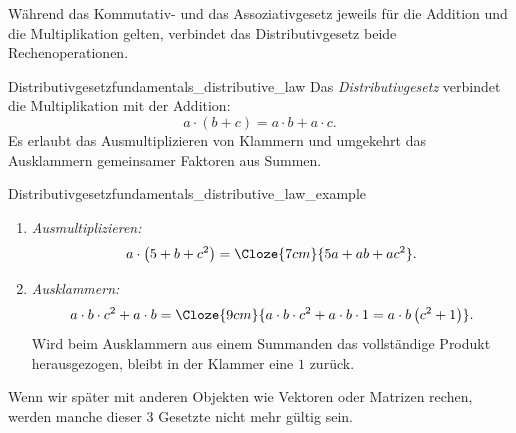 \noindent\begin{minipage}{\linewidth}
Während das Kommutativ- und das Assoziativgesetz jeweils für die Addition und
die Multiplikation gelten, verbindet das Distributivgesetz beide Rechenoperationen.
%
\begin{DefinitionBox}{Distributivgesetz}{fundamentals_distributive_law}
  Das \emph{Distributivgesetz}  verbindet die
  Multiplikation mit der Addition:
  \[
    a\cdot(b+c)=a\cdot b+a\cdot c.
  \]
  Es erlaubt das Ausmultiplizieren von Klammern und umgekehrt das Ausklammern
  gemeinsamer Faktoren aus Summen.
\end{DefinitionBox}

\begin{ExampleBox}{Distributivgesetz}{fundamentals_distributive_law_example}
  \begin{enumerate}[label=\alph*),itemsep=0.8em]
    \item \emph{Ausmultiplizieren:}
      \[
        a\cdot\left(5+b+c^2\right)
        =\Cloze{7cm}{5a+ab+ac^2}.
      \]
    \item \emph{Ausklammern:}
      \[
        a\cdot b\cdot c^2+a\cdot b
        =\Cloze{9cm}{a\cdot b\cdot c^2+a\cdot b\cdot 1
          =a\cdot b\left(c^2+1\right)}.
      \]
      Wird beim Ausklammern aus einem Summanden das vollständige Produkt herausgezogen, bleibt in der Klammer eine $1$ zurück.
  \end{enumerate}
\end{ExampleBox}
\end{minipage}

\vspace{1cm}
Wenn wir später mit anderen Objekten wie Vektoren oder Matrizen rechen,
werden manche dieser 3 Gesetzte nicht mehr gültig sein.
